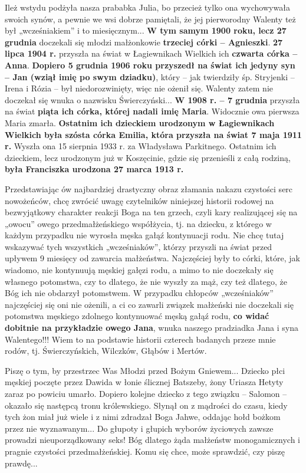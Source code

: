 Ileż wstydu podżyła nasza prababka Julia, bo przecież tylko ona wychowywała swoich synów, a pewnie we wsi dobrze pamiętali, że jej pierworodny Walenty też był „wcześniakiem” i to miesięcznym...\textbf{ W tym samym 1900 roku, lecz 27 grudnia} doczekali się młodzi małżonkowie \textbf{trzeciej córki – Agnieszki}. \textbf{27 lipca 1904 r.} przyszła na świat w Łagiewnikach Wielkich ich \textbf{czwarta córka – Anna}. \textbf{Dopiero 5 grudnia 1906 roku przyszedł na świat ich jedyny syn – Jan (wziął imię po swym dziadku)}, który – jak twierdziły śp. Stryjenki – Irena i Rózia – był niedorozwinięty, więc nie ożenił się. Walenty zatem nie doczekał się wnuka o nazwisku Świerczyński... \textbf{W 1908 r. – 7 grudnia} przyszła na świat \textbf{piąta ich córka, której nadali imię Maria}. Widocznie owa pierwsza Maria zmarła. \textbf{Ostatnim ich dzieckiem urodzonym w Łagiewnikach Wielkich była szósta córka Emilia, która przyszła na świat 7 maja 1911 r.} Wyszła ona 15 sierpnia 1933 r. za Władysława Parkitnego. Ostatnim ich dzieckiem, lecz urodzonym już w Koszęcinie, gdzie się przenieśli z całą rodziną, \textbf{była Franciszka urodzona 27 marca 1913 r.}

Przedstawiając ów najbardziej drastyczny obraz złamania nakazu czystości serc nowożeńców, chcę zwrócić uwagę czytelników niniejszej historii rodowej na bezwyjątkowy charakter reakcji Boga na ten grzech, czyli kary realizującej się na „owocu” owego przedmałżeńskiego współżycia, tj. na dziecku, z którego w każdym przypadku nie wyrosła męska gałąź kontynuacji rodu. Nie chcę tutaj wskazywać tych wszystkich „wcześniaków”, którzy przyszli na świat przed upływem 9 miesięcy od zawarcia małżeństwa. Najczęściej były to córki, które, jak wiadomo, nie kontynuują męskiej gałęzi rodu, a mimo to nie doczekały się własnego potomstwa, czy to dlatego, że nie wyszły za mąż, czy też dlatego, że Bóg ich nie obdarzył potomstwem. W przypadku chłopców „wcześniaków” najczęściej się oni nie ożenili, a ci co zawarli związek małżeński nie doczekali się potomstwa męskiego zdolnego kontynuować męską gałąź rodu, \textbf{co widać dobitnie na przykładzie owego Jana}, wnuka naszego pradziadka Jana i syna Walentego!!! Wiem to na podstawie historii czterech badanych przeze mnie rodów, tj. Świerczyńskich, Wilczków, Głąbów i Mertów.

Piszę o tym, by przestrzec Was Młodzi przed Bożym Gniewem... Dziecko płci męskiej poczęte przez Dawida w łonie ślicznej Batszeby, żony Uriasza Hetyty zaraz po powiciu umarło. Dopiero kolejne dziecko z tego związku – Salomon – okazało się następcą tronu królewskiego. Słynął on z mądrości do czasu, kiedy tych żon miał już wiele i z nimi zdradzał Boga Jahwe, oddając hołd bożkom przez nie wyznawanym... Do głupoty i głupich wyborów życiowych zawsze prowadzi nieuporządkowany seks! Bóg dlatego żąda małżeństw monogamicznych i pragnie czystości przedmałżeńskiej. Komu się chce, może sprawdzić, czy piszę prawdę...

